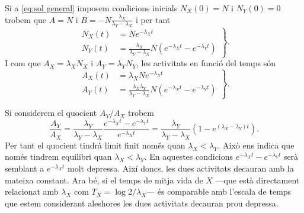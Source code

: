 \documentclass[12pt]{article}
\begin{document}
Si a \ref{eq:sol general} imposem condicions inicials \( N_X(0) = N \) i \( N_Y(0) = 0 \) trobem que \( A = N \) i \( B = -N\frac{\lambda_X}{\lambda_Y - \lambda_X} \) i per tant 
\begin{equation*}
	\left.
		\begin{aligned}
			N_X(t) &= Ne^{-\lambda_X t} \\
			N_Y(t) &= \frac{\lambda_X}{\lambda_Y - \lambda_X}N \left(e^{-\lambda_X t} - e^{-\lambda_Y t}\right)
		\end{aligned}
	\right\}.
\end{equation*}
I com que \( A_X = \lambda_X N_X \) i \( A_Y = \lambda_Y N_Y \), les activitats en funció del temps són
\begin{equation} \label{eq:activitats}
	\left.
		\begin{aligned}
			A_X(t) &= \lambda_XNe^{-\lambda_X t} \\
			A_Y(t) &= \frac{\lambda_X \lambda_Y}{\lambda_Y - \lambda_X}N \left(e^{-\lambda_X t} - e^{-\lambda_Y t}\right)
		\end{aligned}
	\right\}.
\end{equation}

Si considerem el quocient \( A_Y / A_X \) trobem
\begin{equation*}
	\frac{A_Y}{A_X} = \frac{\lambda_Y}{\lambda_Y - \lambda_X} \frac{e^{-\lambda_X t} - e^{-\lambda_Y t}}{e^{-\lambda_X t}} = \frac{\lambda_Y}{\lambda_Y - \lambda_X} \left(1 - e^{(\lambda_X - \lambda_Y) t}\right).
\end{equation*}
Per tant el quocient tindrà límit finit només quan \( \lambda_X < \lambda_Y \). Això ens indica que només tindrem equilibri quan \( \lambda_X < \lambda_Y \). En aquestes condicions \( e^{-\lambda_X t} - e^{-\lambda_Y t} \) serà semblant a \( e^{-\lambda_X t}  \) molt depressa. Així doncs, les dues activitats decauran amb la mateixa constant. Ara bé, si el temps de mitja vida de \( X \) ---que està directament relacionat amb \( \lambda_X \) com \( T_X = \log{2}/\lambda_X \)--- és comparable amb l'escala de temps que estem considerant aleshores les dues activitats decauran prou depressa.  
\end{document}
